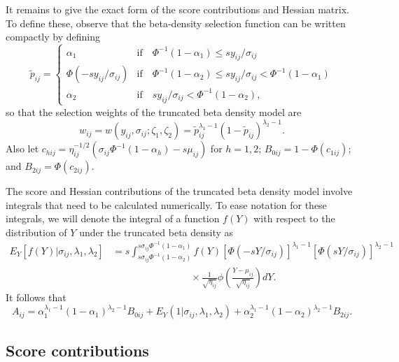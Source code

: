 \documentclass[
  american,
  man, donotrepeattitle,floatsintext]{apa7}
\begin{document}
It remains to give the exact form of the score contributions and Hessian matrix. To define these, observe that the beta-density selection function can be written compactly by defining
\begin{equation}
\tilde{p}_{ij} = \begin{cases}
\alpha_1 & \text{if} \quad \Phi^{-1}(1 - \alpha_1) \leq s y_{ij} / \sigma_{ij} \\
\Phi\left(-s y_{ij} / \sigma_{ij}\right) & \text{if} \quad \Phi^{-1}(1 - \alpha_2) \leq s y_{ij} / \sigma_{ij} < \Phi^{-1}(1 - \alpha_1) \\
\alpha_2 & \text{if} \quad s y_{ij} / \sigma_{ij} < \Phi^{-1}(1 - \alpha_2),
\end{cases}
\end{equation}
so that the selection weights of the truncated beta density model are
\begin{equation}
w_{ij} = w\left(y_{ij}, \sigma_{ij}; \zeta_1, \zeta_2 \right) = \tilde{p}_{ij}^{\lambda_1 - 1} \left(1 - \tilde{p}_{ij}\right)^{\lambda_2 - 1}.
\end{equation}
Also let \(c_{hij} = \eta_{ij}^{-1/2}\left(\sigma_{ij} \Phi^{-1}(1 - \alpha_h) - s \mu_{ij}\right)\) for \(h = 1,2\); \(B_{0ij} = 1 - \Phi(c_{1ij})\); and \(B_{2ij} = \Phi(c_{2ij})\).

The score and Hessian contributions of the truncated beta density model involve integrals that need to be calculated numerically.
To ease notation for these integrals, we will denote the integral of a function \(f(Y)\) with respect to the distribution of \(Y\) under the truncated beta density as
\begin{align}
E_Y\left[f(Y)| \sigma_{ij}, \lambda_1, \lambda_2\right] &= s \int_{s \sigma_{ij} \Phi^{-1}(1 - \alpha_2)}^{s \sigma_{ij} \Phi^{-1}(1 - \alpha_1)} f(Y) \left[\Phi(-s Y / \sigma_{ij})\right]^{\lambda_1 - 1} \left[\Phi(s Y / \sigma_{ij})\right]^{\lambda_2 - 1} \nonumber \\
& \qquad \qquad \qquad \qquad \times \frac{1}{\sqrt{\eta_{ij}}}\phi\left(\frac{Y - \mu_{ij}}{\sqrt{\eta_{ij}}}\right) dY.
\end{align}
It follows that
\begin{equation}
A_{ij} = \alpha_1^{\lambda_1 - 1} (1 - \alpha_1)^{\lambda_2 - 1} B_{0ij} + E_Y(1 | \sigma_{ij}, \lambda_1,\lambda_2) + \alpha_2^{\lambda_1 - 1} (1 - \alpha_2)^{\lambda_2 - 1} B_{2ij}.
\end{equation}

\subsection{Score contributions}\label{score-contributions}
\end{document}
